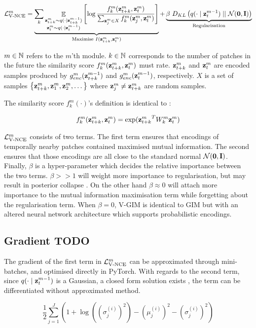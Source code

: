 	\begin{equation} %
		\Lvnce^m =
		\underbrace{\reconstrgim}_{\text{Maximise } I(\ztk^m, \zt^m)} + \underbrace{\beta ~ \latentspaceconstraintgim}_{\text{Regularisation}}
		\label{eq:variational_gim_loss}
	\end{equation}

	$m \in \mathbb{N}$ refers to the $m$'th module. $k \in \mathbb{N}$ corresponds to the number of patches in the future the similarity score $f_k^m(\mathbf{z}_{t+k}^m,\mathbf{z}_t^m)$ must rate. $\mathbf{z}_{t+k}^m$ and $\mathbf{z}_t^m$ are encoded samples produced by $g_{enc}^m(\mathbf{z}_{t+k}^{m-1})$ and $g_{enc}^m(\mathbf{z}_t^{m-1})$, respectively. $X$ is a set of samples ${ \left\{ \mathbf{z}_{t+k}^m, \mathbf{z}_1^m, \mathbf{z}_2^m, \dots \right\} }$ where $\mathbf{z}_j^m \neq \mathbf{z}_{t+k}^m$ are random samples.


	The similarity score $f_k^m(\cdot)$'s definition is identical to \cite{lowePuttingEndEndtoEnd2020}:
	
	$$ f_k^m(\mathbf{z}_{t+k}^m,\mathbf{z}_t^m) = \exp({\mathbf{z}_{t+k}^m}^TW_k^m\mathbf{z}_t^m) $$
	
	$\mathcal{L}_{\text{V-NCE}}^m$ consists of two terms. The first term ensures that encodings of temporally nearby patches contained maximised mutual information. The second ensures that those encodings are all close to the standard normal $\mathcal{N}(\bm{\mathbf{0}}, \mathbf{I})$. Finally, $\beta$ is a hyper-parameter which decides the relative importance between the two terms. $\beta >> 1$ will weight more importance to regularisation, but may result in posterior collapse \cite{lucasUnderstandingPosteriorCollapse2022}. On the other hand $\beta \approx 0$ will attach more importance to the mutual information maximisation term while forgetting about the regularisation term. When $\beta = 0$, V-GIM is identical to GIM but with an altered neural network architecture which supports probabilistic encodings.
	
	\subsection{Gradient \textbf{TODO}}
		The gradient of the first term in $\mathcal{L}_{\text{V-NCE}}^m$ can be approximated through mini-batches, and optimised directly in PyTorch. With regards to the second term, since $q(\cdot \mid \mathbf{z}_t^{m-1})$ is a Gaussian, a closed form solution exists \cite{kingmaAutoEncodingVariationalBayes2022}, the term can be differentiated without approximated method.
		
		
		\begin{equation}
			\frac{1}{2}\sum_{j=1}^J \left( 1 + \log((\sigma_j^{(i)})^2) - (\mu_j^{(i)})^2 - (\sigma_j^{(i)})^2 \right) 
		\end{equation}
		
